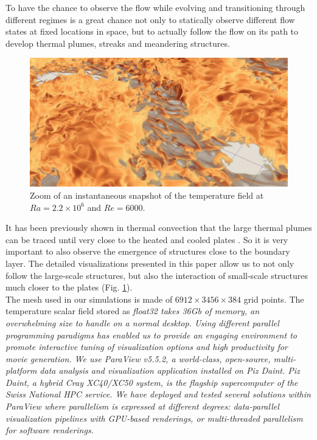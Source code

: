 \documentclass[final,5p,times,twocolumn]{elsarticle}
\begin{document}
To have the chance to observe the flow while evolving and transitioning through different regimes is a great chance not only to statically observe different flow states at fixed locations in space, but to actually follow the flow on its path to develop thermal plumes, streaks and meandering structures.

\begin{figure}
	\centering
	\includegraphics[width=\linewidth]{smallscale}%
	\caption{\label{fig:smallscale} Zoom of an instantaneous snapshot of the temperature field at $ Ra=2.2 \times 10^6 $ and $ Re=6000 $.}
\end{figure}

It has been previously shown in thermal convection that the large thermal plumes can be traced until very close to the heated and cooled plates \cite{ste18}. So it is very important to also observe the emergence of structures close to the boundary layer. The detailed visualizations presented in this paper allow us to not only follow the large-scale structures, but also the interaction of small-scale structures much closer to the plates (Fig. \ref{fig:smallscale}).\\

The mesh used in our simulations is made of $ 6912 \times 3456 \times 384 $ grid points.
The temperature scalar field stored as \it{float32} \rm takes 36Gb of memory, an
overwhelming size to handle on a normal desktop. Using different parallel programming
paradigms has enabled us to provide an engaging environment
to promote interactive tuning of visualization options and high productivity for movie
generation. We use ParaView v5.5.2, a world-class, open-source, multi-platform data analysis and
visualization application installed on Piz Daint. Piz Daint, a hybrid Cray XC40/XC50 system,
is the flagship supercomputer of the Swiss National HPC service. We have deployed
and tested several solutions within ParaView where parallelism is expressed
at different degrees: data-parallel visualization pipelines with GPU-based renderings,
or multi-threaded parallelism for software renderings.
\end{document}
